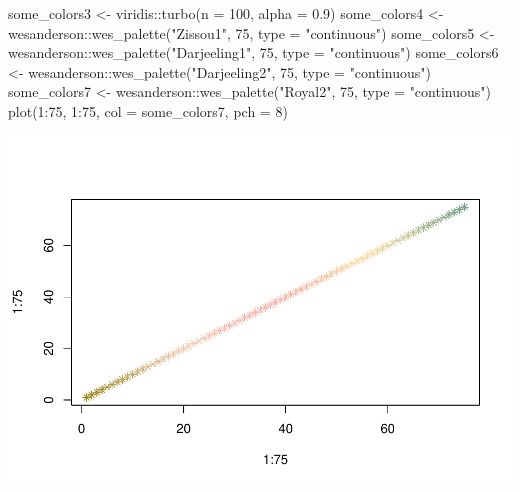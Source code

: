 \documentclass[
  11pt,
]{article}
\newenvironment{Shaded}{\begin{snugshade}}{\end{snugshade}}
\newcommand{\AttributeTok}[1]{\textcolor[rgb]{0.77,0.63,0.00}{#1}}
\newcommand{\DecValTok}[1]{\textcolor[rgb]{0.00,0.00,0.81}{#1}}
\newcommand{\FloatTok}[1]{\textcolor[rgb]{0.00,0.00,0.81}{#1}}
\newcommand{\FunctionTok}[1]{\textcolor[rgb]{0.00,0.00,0.00}{#1}}
\newcommand{\NormalTok}[1]{#1}
\newcommand{\OtherTok}[1]{\textcolor[rgb]{0.56,0.35,0.01}{#1}}
\newcommand{\SpecialCharTok}[1]{\textcolor[rgb]{0.00,0.00,0.00}{#1}}
\newcommand{\StringTok}[1]{\textcolor[rgb]{0.31,0.60,0.02}{#1}}
\begin{document}
\begin{Shaded}
\begin{Highlighting}[]
\NormalTok{some\_colors3 }\OtherTok{\textless{}{-}}\NormalTok{ viridis}\SpecialCharTok{::}\FunctionTok{turbo}\NormalTok{(}\AttributeTok{n =} \DecValTok{100}\NormalTok{, }\AttributeTok{alpha =} \FloatTok{0.9}\NormalTok{)}
\NormalTok{some\_colors4 }\OtherTok{\textless{}{-}}\NormalTok{ wesanderson}\SpecialCharTok{::}\FunctionTok{wes\_palette}\NormalTok{(}\StringTok{"Zissou1"}\NormalTok{, }\DecValTok{75}\NormalTok{, }\AttributeTok{type =} \StringTok{"continuous"}\NormalTok{)}
\NormalTok{some\_colors5 }\OtherTok{\textless{}{-}}\NormalTok{ wesanderson}\SpecialCharTok{::}\FunctionTok{wes\_palette}\NormalTok{(}\StringTok{"Darjeeling1"}\NormalTok{, }\DecValTok{75}\NormalTok{, }\AttributeTok{type =} \StringTok{"continuous"}\NormalTok{)}
\NormalTok{some\_colors6 }\OtherTok{\textless{}{-}}\NormalTok{ wesanderson}\SpecialCharTok{::}\FunctionTok{wes\_palette}\NormalTok{(}\StringTok{"Darjeeling2"}\NormalTok{, }\DecValTok{75}\NormalTok{, }\AttributeTok{type =} \StringTok{"continuous"}\NormalTok{)}
\NormalTok{some\_colors7 }\OtherTok{\textless{}{-}}\NormalTok{ wesanderson}\SpecialCharTok{::}\FunctionTok{wes\_palette}\NormalTok{(}\StringTok{"Royal2"}\NormalTok{, }\DecValTok{75}\NormalTok{, }\AttributeTok{type =} \StringTok{"continuous"}\NormalTok{)}
\FunctionTok{plot}\NormalTok{(}\DecValTok{1}\SpecialCharTok{:}\DecValTok{75}\NormalTok{, }\DecValTok{1}\SpecialCharTok{:}\DecValTok{75}\NormalTok{, }\AttributeTok{col =}\NormalTok{ some\_colors7, }\AttributeTok{pch =} \DecValTok{8}\NormalTok{)}
\end{Highlighting}
\end{Shaded}

\includegraphics{Supp_Info_1_files/figure-latex/unnamed-chunk-7-1.pdf}
\end{document}
